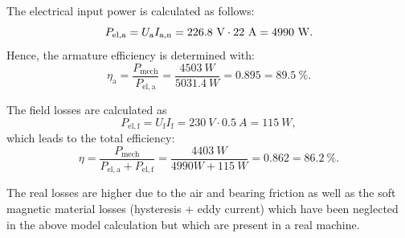 \begin{solutionblock}
	The electrical input power is calculated as follows:
	\begin{equation}
		P_{\mathrm{el,a}} = \Ua I_{\mathrm{a,n}}
		= 226.8 \ \si{V} \cdot 22 \ \si{A}
		= 4990 \ \si{W}.
	\end{equation}
	Hence, the armature efficiency is determined with:
	\begin{equation}
		\eta_{\mathrm{a}} = \frac{P_{\mathrm{mech}}}{P_{\mathrm{el,a}}}
		= \frac{4503 \ \si{W}}{5031.4 \ \si{W}}
		= 0.895
		= 89.5 \ \%.
	\end{equation}

	The field losses are calculated as
	\begin{equation}
		P_{\mathrm{el,f}} = U_{\mathrm{f}} I_{\mathrm{f}}
		= 230 \ \si{V} \cdot 0.5 \ \si{A}
		= 115 \ \si{W},
	\end{equation}
	which leads to the total efficiency:
	\begin{equation}
		\eta = \frac{P_{\mathrm{mech}}}{P_{\mathrm{el,a}}+P_{\mathrm{el,f}}}
		= \frac{4403 \ \si{W}}{4990 \si{W} + 115 \ \si{W}}
		= 0.862
		= 86.2 \ \%.
	\end{equation}

	The real losses are higher due to the air and bearing friction as well as the soft magnetic material losses (hysteresis + eddy current) which have been neglected in the above model calculation but which are present in a real machine.
\end{solutionblock}


